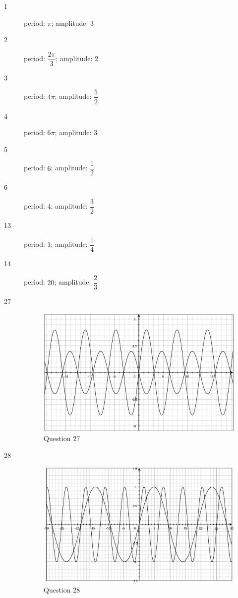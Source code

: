 \documentclass[fleqn,addpoints]{exam}
\begin{document}
\begin{description}

\item[1] period: $\pi$; amplitude: 3

\item[2] period: $\dfrac{2 \pi}{3}$; amplitude: 2

\item[3] period: $4 \pi$; amplitude: $\dfrac{5}{2}$

\item[4] period: $6 \pi$; amplitude: $3$

\item[5] period: $6$; amplitude: $\dfrac{1}{2}$

\item[6] period: $4$; amplitude: $\dfrac{3}{2}$

\item[13] period: $1$; amplitude: $\dfrac{1}{4}$

\item[14] period: $20$; amplitude: $\dfrac{2}{3}$

\item[27]
\begin{figure}[H]
  \centering
  \includegraphics[scale=.3]{question27.eps}
  \caption*{Question 27}
\end{figure}

\item[28]
\begin{figure}[H]
  \centering
  \includegraphics[scale=.3]{question28.eps}
  \caption*{Question 28}
\end{figure}


\end{description}
\end{document}
